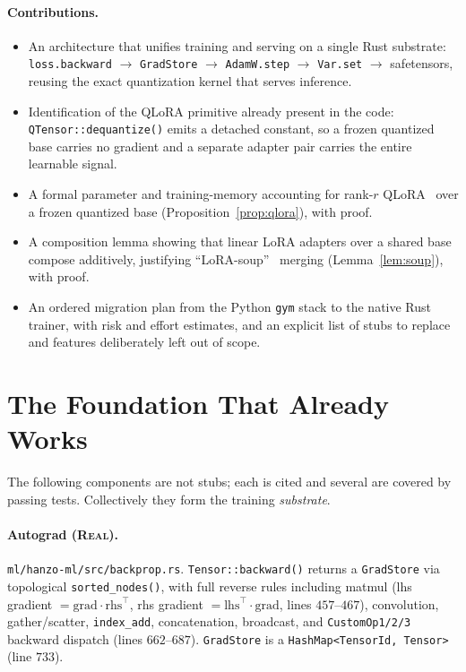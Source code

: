 \documentclass[11pt]{article}
\begin{document}
\paragraph{Contributions.}
\begin{itemize}
    \item An architecture that unifies training and serving on a single Rust substrate: \texttt{loss.backward} $\to$ \texttt{GradStore} $\to$ \texttt{AdamW.step} $\to$ \texttt{Var.set} $\to$ safetensors, reusing the exact quantization kernel that serves inference.
    \item Identification of the QLoRA primitive already present in the code: \texttt{QTensor::dequantize()} emits a detached constant, so a frozen quantized base carries no gradient and a separate adapter pair carries the entire learnable signal.
    \item A formal parameter and training-memory accounting for rank-$r$ QLoRA~\cite{hu2021lora,dettmers2023qlora} over a frozen quantized base (Proposition~\ref{prop:qlora}), with proof.
    \item A composition lemma showing that linear LoRA adapters over a shared base compose additively, justifying ``LoRA-soup''~\cite{wortsman2022soups} merging (Lemma~\ref{lem:soup}), with proof.
    \item An ordered migration plan from the Python \texttt{gym} stack to the native Rust trainer, with risk and effort estimates, and an explicit list of stubs to replace and features deliberately left out of scope.
\end{itemize}

\section{The Foundation That Already Works}
\label{sec:foundation}

The following components are not stubs; each is cited and several are covered by passing tests. Collectively they form the training \emph{substrate}.

\paragraph{Autograd (\textsc{Real}).} \texttt{ml/hanzo-ml/src/backprop.rs}. \texttt{Tensor::backward()} returns a \texttt{GradStore} via topological \texttt{sorted\_nodes()}, with full reverse rules including matmul (lhs gradient $= \mathrm{grad} \cdot \mathrm{rhs}^{\top}$, rhs gradient $= \mathrm{lhs}^{\top} \cdot \mathrm{grad}$, lines $457$--$467$), convolution, gather/scatter, \texttt{index\_add}, concatenation, broadcast, and \texttt{CustomOp1/2/3} backward dispatch (lines $662$--$687$). \texttt{GradStore} is a \texttt{HashMap<TensorId, Tensor>} (line $733$).
\end{document}
